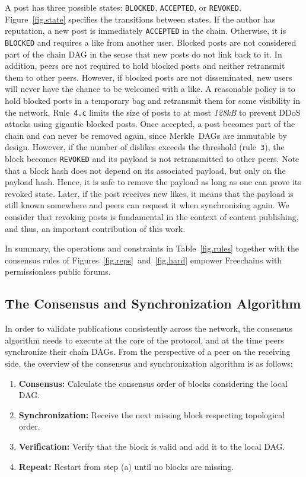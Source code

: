 \documentclass[10pt,journal,compsoc]{IEEEtran}
\newcommand{\FC}       {Freechains\xspace}
\newcommand{\code}[1]  {\texttt{\footnotesize{#1}}}
\begin{document}
A post has three possible states: \code{BLOCKED}, \code{ACCEPTED}, or
\code{REVOKED}.
Figure~\ref{fig.state} specifies the transitions between states.
%
If the author has reputation, a new post is immediately \code{ACCEPTED} in the
chain.
%
Otherwise, it is \code{BLOCKED} and requires a like from another user.
Blocked posts are not considered part of the chain DAG in the sense that new
posts do not link back to it.
In addition, peers are not required to hold blocked posts and neither
retransmit them to other peers.
However, if blocked posts are not disseminated, new users will never have the
chance to be welcomed with a like.
A reasonable policy is to hold blocked posts in a temporary bag and retransmit
them for some visibility in the network.
Rule~\code{4.c} limits the size of posts to at most \emph{128kB} to prevent
DDoS attacks using gigantic blocked posts.
%
Once accepted, a post becomes part of the chain and can never be removed
again, since Merkle~DAGs are immutable by design.
%
However, if the number of dislikes exceeds the threshold (rule~\code{3}), the
block becomes \code{REVOKED} and its payload is not retransmitted to other
peers.
Note that a block hash does not depend on its associated payload, but only on
the payload hash.
Hence, it is safe to remove the payload as long as one can prove its revoked
state.
Later, if the post receives new likes, it means that the payload is still known
somewhere and peers can request it when synchronizing again.
We consider that revoking posts is fundamental in the context of content
publishing, and thus, an important contribution of this work.

In summary, the operations and constraints in Table~\ref{fig.rules} together
with the consensus rules of Figures~\ref{fig.reps}~and~\ref{fig.hard} empower
\FC with permissionless public forums.

\subsection{The Consensus and Synchronization Algorithm}
\label{sec.consensus.algo}

In order to validate publications consistently across the network, the
consensus algorithm needs to execute at the core of the protocol, and at the
time peers synchronize their chain DAGs.
From the perspective of a peer on the receiving side, the overview of the
consensus and synchronization algorithm is as follows:
\begin{enumerate}
\item \textbf{Consensus:}
    Calculate the consensus order of blocks considering the local DAG.
\item \textbf{Synchronization:}
    Receive the next missing block respecting topological order.
\item \textbf{Verification:}
    Verify that the block is valid and add it to the local DAG.
\item \textbf{Repeat:}
    Restart from step (a) until no blocks are missing.
\end{enumerate}
\end{document}
